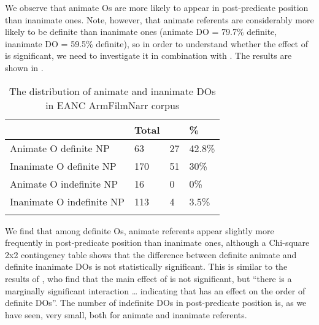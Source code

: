 \documentclass[output=paper,colorlinks,citecolor=brown,draftmode]{langscibook}
\begin{document}
 We observe that animate Os are more likely to appear in post-predicate position than inanimate ones. Note, however, that animate referents are considerably more likely to be definite than inanimate ones (animate DO = 79.7\% definite, inanimate DO = 59.5\% definite), so in order to understand whether the effect of  is significant, we need to investigate it in combination with . The results are shown in .

\begin{table}
    \begin{tabularx}{.8\textwidth}{lYYY}
\lsptoprule
 & Total &  & \%  \\
\midrule
Animate O definite NP & 63 & 27 & 42.8\% \\
Inanimate O definite NP & 170 & 51 & 30\% \\
Animate O indefinite NP & 16 & 0 & 0\% \\
Inanimate O indefinite NP & 113 & 4 & 3.5\% \\
\lspbottomrule
    \end{tabularx}
    \caption{The distribution of animate and inanimate DOs in EANC ArmFilmNarr corpus }
    \label{Armenian:tab:6}
\end{table}

We find that among definite Os, animate referents appear slightly more frequently in post-predicate position than inanimate ones, although a Chi-square 2x2 contingency table shows that the difference between definite animate and definite inanimate DOs is not statistically significant. This is similar to the results of \citet[481]{samvelian_persistence_2023}, who find that the main effect of  is not significant, but “there is a marginally significant interaction … indicating that  has an effect on the order of definite DOs”. The number of indefinite DOs in post-predicate position is, as we have seen, very small, both for animate and inanimate referents.
\end{document}
